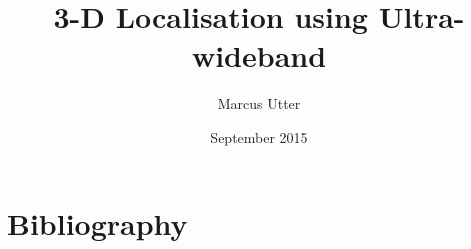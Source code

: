 \documentclass{article}
\title{3-D Localisation using Ultra-wideband}
\author{Marcus Utter }
\date{September 2015}
\begin{document}
\maketitle
\clearpage

\tableofcontents
\clearpage






%

%

%

%

\section{Bibliography}


\end{document}
